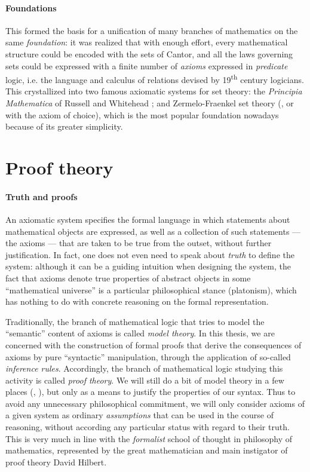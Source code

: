 \paragraph{Foundations}

This formed the basis for a unification of many branches of mathematics on the
same \emph{foundation}: it was realized that with enough effort, every
mathematical structure could be encoded with the sets of Cantor, and all the
laws governing sets could be expressed with a finite number of \emph{axioms}
expressed in \emph{predicate} logic, i.e. the language and calculus of relations
devised by 19\textsuperscript{th} century logicians. This crystallized into two
famous axiomatic systems for set theory: the \textit{Principia Mathematica} of
Russell and Whitehead ; and Zermelo-Fraenkel set theory
(, or  with the axiom of choice), which is the most popular
foundation nowadays because of its greater simplicity.

\section{Proof theory}

\paragraph{Truth and proofs}

An axiomatic system specifies the formal language in which statements about
mathematical objects are expressed, as well as a collection of such statements
--- the axioms --- that are taken to be true from the outset, without further
justification. In fact, one does not even need to speak about \emph{truth} to
define the system: although it can be a guiding intuition when designing the
system, the fact that axioms denote true properties of abstract objects in some
``mathematical universe'' is a particular philosophical stance (platonism),
which has nothing to do with concrete reasoning on the formal representation.

Traditionally, the branch of mathematical logic that tries to model the
``semantic'' content of axioms is called \emph{model theory}. In this thesis, we
are concerned with the construction of formal proofs that derive the
consequences of axioms by pure ``syntactic'' manipulation, through the
application of so-called \emph{inference rules}. Accordingly, the branch of
mathematical logic studying this activity is called \emph{proof theory}. We will
still do a bit of model theory in a few places (,
), but only as a means to justify the properties of our
syntax. Thus to avoid any unnecessary philosophical commitment, we will only
consider axioms of a given system as ordinary \emph{assumptions} that can be
used in the course of reasoning, without according any particular status with
regard to their truth. This is very much in line with the \emph{formalist}
school of thought in philosophy of mathematics, represented by the great
mathematician and main instigator of proof theory David Hilbert.

